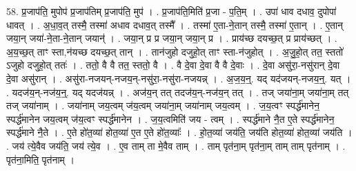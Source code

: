 \documentclass[17pt]{extarticle}
\begin{document}
58. प्र॒जाप॑ति॒ मुपोप॑ प्र॒जाप॑तिम् प्र॒जाप॑ति॒ मुप॑ । . प्र॒जाप॑ति॒मिति॑ प्र॒जा - प॒ति॒म् । . उपा॑ धाव दधाव॒ दुपोपा॑ धावत् । . अ॒धा॒व॒त् तस्मै॒ तस्मा॑ अधाव दधाव॒त् तस्मै᳚ । . तस्मा॑ ए॒ता-ने॒तान् तस्मै॒ तस्मा॑ ए॒तान् । . ए॒तान् जया॒न् जया॑-ने॒ता-ने॒तान् जयान्॑ । . जया॒न् प्र प्र जया॒न् जया॒न् प्र । . प्राय॑च्छ दयच्छ॒त् प्र प्राय॑च्छत् । . अ॒य॒च्छ॒त् ताꣳ स्ता,न॑यच्छ दयच्छ॒त् तान् । . तान॑जुहो दजुहो॒त् ताꣳ स्ता-न॑जुहोत् । . अ॒जु॒हो॒त् तत॒ स्ततो॑ ऽजुहो दजुहो॒त् ततः॑ । . ततो॒ वै वै तत॒ स्ततो॒ वै । . वै दे॒वा दे॒वा वै वै दे॒वाः । . दे॒वा असु॑रा॒-नसु॑रान् दे॒वा दे॒वा असु॑रान् । . असु॑रा-नजयन्-नजय॒न्-नसु॑रा॒-नसु॑रा-नजयन्न् । . अ॒ज॒य॒न्॒. यद् यद॑जयन्-नजय॒न्॒. यत् । . यदज॑य॒न्-नज॑य॒न्॒. यद् यदज॑यन्न् । . अज॑य॒न् तत् तदज॑य॒न्-नज॑य॒न् तत् । . तज् जया॑ना॒म् जया॑ना॒म् तत् तज् जया॑नाम् । . जया॑नाम् जय॒त्वम् ज॑य॒त्वम् जया॑ना॒म् जया॑नाम् जय॒त्वम् । . ज॒य॒त्वꣳ स्पर्द्ध॑मानेन॒ स्पर्द्ध॑मानेन जय॒त्वम् ज॑य॒त्वꣳ स्पर्द्ध॑मानेन । . ज॒य॒त्वमिति॑ जय - त्वम् । . स्पर्द्ध॑माने नै॒त ए॒ते स्पर्द्ध॑मानेन॒ स्पर्द्ध॑माने नै॒ते । . ए॒ते हो॑त॒व्या॑ होत॒व्या॑ ए॒त ए॒ते हो॑त॒व्याः᳚ । . हो॒त॒व्या॑ जय॑ति॒ जय॑ति होत॒व्या॑ होत॒व्या॑ जय॑ति । . जय॑ त्ये॒वैव जय॑ति॒ जय॑ त्ये॒व । . ए॒व ताम् ता मे॒वैव ताम् । . ताम् पृत॑ना॒म् पृत॑ना॒म् ताम् ताम् पृत॑नाम् । . पृत॑ना॒मिति॒ पृत॑नाम् । \newline
\end{document}
